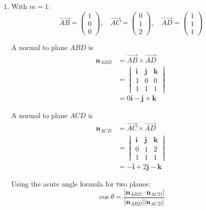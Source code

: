 \documentclass[leqno]{article}
\begin{document}
\begin{enumerate}[
  label=\textbf{\arabic*.},
  leftmargin=*,
  topsep=0pt,
  partopsep=0pt,
  parsep=0pt
]
\begin{djsSolution}
\begin{enumerate}[label=\textbf{(\alph*)}]
So
\[
\left\lvert \overrightarrow{AC}\times\overrightarrow{AD}\right\rvert=\sqrt{(-1)^2+2^2+(-1)^2}=\sqrt{6}
\]

and
\[
\left\lvert \overrightarrow{AD}\right\rvert=\sqrt{1^2+1^2+1^2}=\sqrt{3}
\]

Hence the shortest distance is
\[
\frac{\sqrt{6}}{\sqrt{3}}=\sqrt{2}
\]

So the shortest distance of \(C\) from the line through \(A\) and \(D\) is
\[
\sqrt{2}
\]

\item With \(m=1\):
\[
\overrightarrow{AB}=\begin{pmatrix}1\\0\\0\end{pmatrix},\quad \overrightarrow{AC}=\begin{pmatrix}0\\1\\2\end{pmatrix},\quad \overrightarrow{AD}=\begin{pmatrix}1\\1\\1\end{pmatrix}
\]

A normal to plane \(ABD\) is
\begin{align*}
\mathbf n_{ABD}
&=\overrightarrow{AB}\times\overrightarrow{AD} \\
&=
\begin{vmatrix}
\mathbf i & \mathbf j & \mathbf k\\
1 & 0 & 0\\
1 & 1 & 1
\end{vmatrix} \\
&=0\mathbf i-\mathbf j+\mathbf k
\end{align*}

A normal to plane \(ACD\) is
\begin{align*}
\mathbf n_{ACD}
&=\overrightarrow{AC}\times\overrightarrow{AD} \\
&=
\begin{vmatrix}
\mathbf i & \mathbf j & \mathbf k\\
0 & 1 & 2\\
1 & 1 & 1
\end{vmatrix} \\
&=-\mathbf i+2\mathbf j-\mathbf k
\end{align*}

Using the acute angle formula for two planes:
\[
\cos\theta=\frac{\left\lvert \mathbf n_{ABD}\cdot \mathbf n_{ACD}\right\rvert}{\left\lvert \mathbf n_{ABD}\right\rvert\left\lvert \mathbf n_{ACD}\right\rvert}
\]


\end{enumerate}
\end{djsSolution}
\end{enumerate}
\end{document}
